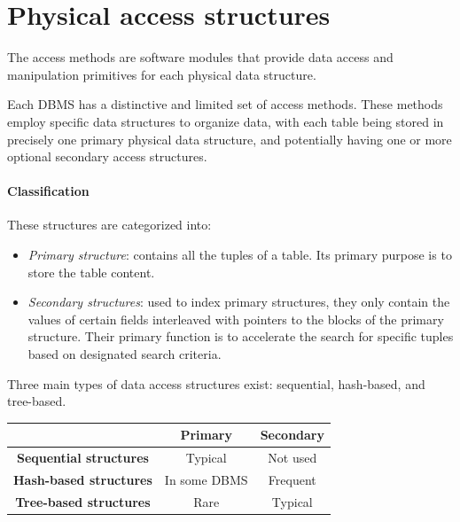 \section{Physical access structures}

\begin{definition}
    The access methods are software modules that provide data access and manipulation primitives for each physical data structure. 
\end{definition}
Each DBMS has a distinctive and limited set of access methods. 
These methods employ specific data structures to organize data, with each table being stored in precisely one primary physical data structure, and potentially having one or more optional secondary access structures.

\paragraph*{Classification}
These structures are categorized into: 
\begin{itemize}
    \item \textit{Primary structure}: contains all the tuples of a table. 
        Its primary purpose is to store the table content. 
    \item \textit{Secondary structures}: used to index primary structures, they only contain the values of certain fields interleaved with pointers to the blocks of the primary structure. 
    Their primary function is to accelerate the search for specific tuples based on designated search criteria.
\end{itemize}
Three main types of data access structures exist: sequential, hash-based, and tree-based.
\begin{table}[H]
    \centering
    \begin{tabular}{c|cc|}
    \cline{2-3}
                                                         & \textbf{Primary} & \textbf{Secondary} \\ \hline
    \multicolumn{1}{|c|}{\textbf{Sequential structures}} & Typical          & Not used           \\
    \multicolumn{1}{|c|}{\textbf{Hash-based structures}} & In some DBMS     & Frequent           \\
    \multicolumn{1}{|c|}{\textbf{Tree-based structures}} & Rare             & Typical            \\ \hline
    \end{tabular}
\end{table}

